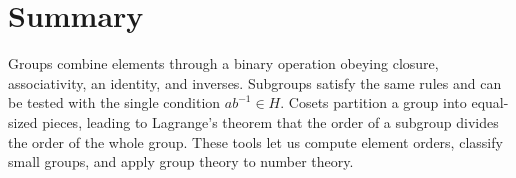 \documentclass[12pt]{article}
\begin{document}
\section*{Summary}
Groups combine elements through a binary operation obeying closure, associativity, an identity, and inverses.
Subgroups satisfy the same rules and can be tested with the single condition $ab^{-1}\in H$.
Cosets partition a group into equal-sized pieces, leading to Lagrange's theorem that the order of a subgroup divides the order of the whole group.
These tools let us compute element orders, classify small groups, and apply group theory to number theory.
\end{document}
